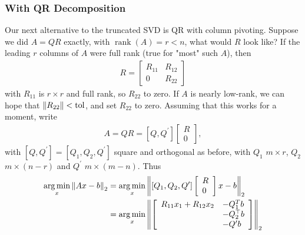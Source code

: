 \documentclass[11pt]{article}
\numberwithin{equation}{section}
\begin{document}
\subsubsection{With QR Decomposition}
Our next alternative to the truncated SVD is QR with column pivoting. Suppose we did $A = QR$ exactly, with $\operatorname{rank}(A)=r<n$, what would $R$ look like?
If the leading $r$ columns of $A$ were full rank (true for "most" such $A$), then \begin{align*}
    R=\left[\begin{array}{ll}
        R_{11} & R_{12} \\
        0 & R_{22}
        \end{array}\right]
\end{align*}
with $R_{11}$ is $r \times r$ and full rank, so $R_{22}$ to zero. If $A$ is nearly low-rank, we can hope that $\left\| R_{22} \right\| < \mathrm{tol}$,
and set $R_{22}$ to zero. Assuming that this works for a moment, write \begin{align*}
    A=Q R=\left[Q, Q^{\prime}\right]\left[\begin{array}{l}
        R \\
        0
        \end{array}\right],
\end{align*}
with $\left[Q, Q^{\prime}\right] = \left[Q_1, Q_2, Q^{\prime}\right]$ square and orthogonal as before, with $Q_1$ $m \times r$, $Q_2$ $m \times (n-r)$ and $Q^\prime$ $m \times (m-n)$.
Thus \begin{align*}
    \underset{x}{\arg \min}\left\| Ax-b \right\|_2 &= \underset{x}{\arg \min}\left\| \left[Q_1, Q_2, Q^{\prime}\right]\left[\begin{array}{l}
        R \\
        0
        \end{array}\right]x-b \right\|_2 \\
        &= \underset{x}{\arg \min}\left\| \left[\begin{array}{rl}
            R_{11} x_{1}+R_{12} x_{2} & -Q_{1}^{T} b \\
            & -Q_{2}^{\top} b \\
            & -Q^{\prime} b
            \end{array}\right] \right\|_2
\end{align*}
\end{document}
